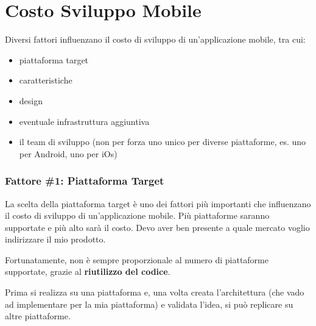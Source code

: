 
\chapter{Costo Sviluppo Mobile}
\par Diversi fattori influenzano il costo di sviluppo di un'applicazione mobile, tra cui:
\begin{itemize}
    \item piattaforma target
    \item caratteristiche
    \item design
    \item eventuale infrastruttura aggiuntiva 
    \item il team di sviluppo (non per forza uno unico per diverse piattaforme, es. uno per Android, uno per iOs)
\end{itemize}

\subsection{Fattore \#1: Piattaforma Target}
\par La scelta della piattaforma target è uno dei fattori più importanti che influenzano il costo di sviluppo di un'applicazione mobile. Più piattaforme saranno supportate e più alto sarà il costo. Devo aver ben presente a quale mercato voglio indirizzare il mio prodotto.
\par Fortunatamente, non è sempre proporzionale al numero di piattaforme supportate, grazie al \textbf{riutilizzo del codice}. 
\par Prima si realizza su una piattaforma e, una volta creata l'architettura (che vado ad implementare per la mia piattaforma) e validata l'idea, si può replicare su altre piattaforme.


